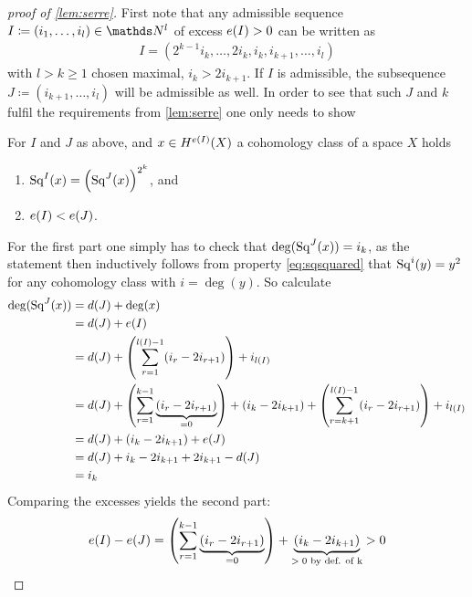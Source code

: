 \begin{proof}[proof of \autoref{lem:serre}]
  First note that any admissible sequence $I\coloneqq(i_1,\dotsc,i_l)\in\Nat^l$
  of excess $e(I)>0$ can be written as
  \begin{gather*}
    I=(2^{k-1}i_k,\dotsc,2i_k,i_k,i_{k+1},\dotsc,i_l)
  \end{gather*}
  with $l>k\geq 1$ chosen maximal, \idest $i_k>2i_{k+1}$. If $I$ is admissible, the subsequence
  $J\coloneqq(i_{k+1},\dotsc,i_l)$ will be admissible as well.
  In order to see that such $J$ and $k$ fulfil the requirements from
  \autoref{lem:serre} one only needs to show
  \begin{claim}
    For $I$ and $J$ as above, and $x\in H^{e(I)}(X)$ a cohomology
    class of a space $X$ holds
    \begin{enumerate}
    \item $\mathrm{Sq}^{I}(x) = \left(\mathrm{Sq}^{J}(x)\right)^{2^k}$, and
    \item $e(I)<e(J)$.
    \end{enumerate}
  \end{claim}
  For the first part one simply has to check that
  $\deg(\mathrm{Sq}^{J}(x))=i_k$, as the statement then inductively follows from
  property \eqref{eq:sqsquared} that $\mathrm{Sq}^{i}(y)=y^2$ for any cohomology
  class with $i=\deg(y)$.
  So calculate
  \begin{align*}
    \deg(\mathrm{Sq}^{J}(x))
    &= d(J) + \deg(x)\\
    &= d(J) + e(I)\\
    &= d(J) 
      + \left(\sum_{r=1}^{l(I)-1}(i_r-2i_{r+1})\right)
      + i_{l(I)}\\
    &= d(J)
      + \left(\sum_{r=1}^{k-1}\underbrace{(i_r-2i_{r+1})}_{=0}\right)
      + (i_k-2i_{k+1})
      +\left(\sum_{r=k+1}^{l(I)-1}(i_r-2i_{r+1})\right) + i_{l(I)}\\
    &= d(J)
      + (i_k-2i_{k+1})
      + e(J) \\
    &= d(J) + i_k - 2i_{k+1} + 2i_{k+1} - d(J) \\
    &= i_k
  \end{align*}
  Comparing the excesses yields the second part:
  \begin{gather*}
    e(I) - e(J)
    = \left(\sum_{r=1}^{k-1}\underbrace{(i_r-2i_{r+1})}_{=0}\right)
    + \underbrace{(i_k - 2i_{k+1})}_{\text{$>0$ by def. of k}}
    > 0
    \qedhere
  \end{gather*}
\end{proof}


